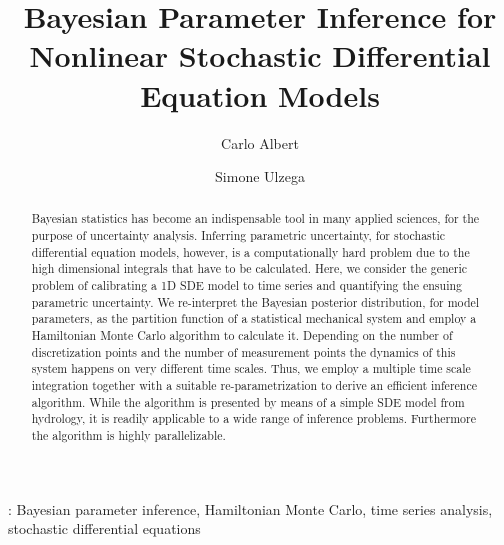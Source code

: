 \documentclass[12pt,a4paper,final]{iopart}
\begin{document}
\title[Parameter inference with stochastic models]{Bayesian Parameter Inference for Nonlinear Stochastic Differential Equation Models}

\author[cor1]{Carlo Albert}%
\address{Eawag, Swiss Federal Institute of Aquatic Science and Technology, 8600 D\"ubendorf, Switzerland}

\author{Simone Ulzega}
\address{Eawag, Swiss Federal Institute of Aquatic Science and Technology, 8600 D\"ubendorf, Switzerland}



\begin{abstract}
Bayesian statistics has become an indispensable tool in many applied sciences, for the purpose of uncertainty analysis.  
Inferring parametric uncertainty, for stochastic differential equation models, however, is a computationally hard problem due to the high dimensional integrals that have to be calculated.
Here, we consider the generic problem of calibrating a 1D SDE model to time series and quantifying the ensuing parametric uncertainty.
We re-interpret the Bayesian posterior distribution, for model parameters, as the partition function of a statistical mechanical system and employ a Hamiltonian Monte Carlo algorithm to calculate it.
Depending on the number of discretization points and the number of measurement points the dynamics of this system happens on very different time scales.
Thus, we employ a multiple time scale integration together with a suitable re-parametrization to derive an efficient inference algorithm.
While the algorithm is presented by means of a simple SDE model from hydrology, it is readily applicable to a wide range of inference problems.
Furthermore the algorithm is highly parallelizable.

\end{abstract}

\vspace{2pc}
: Bayesian parameter inference, Hamiltonian Monte Carlo, time series analysis, stochastic differential equations

\submitto{\NJP}
\end{document}
